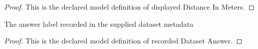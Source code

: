 \begin{proof}
  This is the declared model definition of displayed Distance In Meters.
\end{proof}
\begin{definition}
  \label{def:physics:phyx-mini-0977:phyxminiproblems-problemphyxmini0977-recordeddatasetanswer}
  The answer label recorded in the supplied dataset metadata
\end{definition}
\begin{proof}
  This is the declared model definition of recorded Dataset Answer.
\end{proof}
